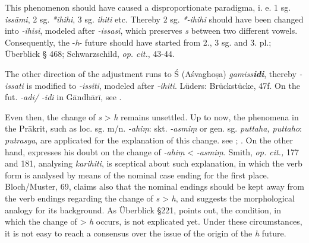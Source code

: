 \documentclass[11pt]{article}
\newcommand*\ṛ{r\symbol{"325}}
\newcommand*\Ṛ{R\symbol{"325}}
\newcommand*\ṝ{r\symbol{"304}\symbol{"325}}
\newcommand*\Ṝ{R\symbol{"304}\symbol{"325}}
\newcommand*\ḷ{l\symbol{"325}}
\newcommand*\ḹ{l\symbol{"304}\symbol{"325}}
\newcommand*\Ḷ{L\symbol{"325}}
\newcommand*\Ḹ{L\symbol{"304}\symbol{"325}}
\begin{document}
This phenomenon should have caused a disproportionate paradigma, i. e. 1 sg. \textit{issāmi}, 2 sg. \textit{*ihihi}, 3 sg. \textit{ihiti} etc.
Thereby 2 sg. \textit{*-ihihi} should have been changed into \textit{-ihisi}, modeled after \textit{-issasi}, which preserves \textit{s} between two different vowels. 
Consequently, the -\textit{h}- future should have started from 2., 3 sg. and 3. pl.; Überblick § 468; Schwarzschild, \textit{op. cit.}, 43-44.

The other direction of the adjustment runs to Ś (Aśvaghoṣa) \textit{gamiss\textbf{idi}}, thereby \textit{-issati} is modified to \textit{-issiti}, modeled after \textit{-ihiti}.
Lüders: Brückstücke, 47f.
%
%
On the fut. \textit{-adi/ -idi} in Gāndhārī, see \citet[103-105]{caillat:1977-78}.

Even then, the change of \textit{s} > \textit{h} remains unsettled.
Up to now, the phenomena in the Prākrit, such as loc. sg. m/n. \textit{-ahiṃ}: skt. \textit{-asmiṃ} or gen. sg. \textit{puttaha, puttaho}: \textit{putrasya},
are applicated for the explanation of this change. see \citet[571]{gray:1936}; \citet[fn2, p. 20]{gsjunko:1991}.
On the other hand, \citet[155-156]{Tedesco:1945} expresses his doubt on the change of  \textit{-ahiṃ} < \textit{-asmiṃ}.
Smith, \textit{op. cit.,} 177 and 181, analysing \textit{karihiti},
is sceptical about such explanation, in which the verb form is analysed by means of the nominal case ending for the first place.
Bloch/Muster, 69, claims also that the nominal endings should be kept away from the verb endings regarding the change of \textit{s} > \textit{h}, and suggests the morphological analogy for its background.
As Überblick \S 221, points out, the condition, in which the change of  > \textit{h} occurs, is not explicated yet.
Under these circumstances, it is not easy to reach a consensus over the issue of the origin of the \textit{h} future.
\end{document}
